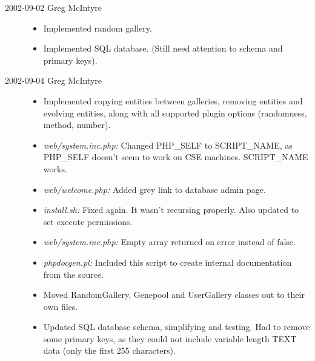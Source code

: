 \documentclass{article}
\begin{document}
\begin{description}
\begin{itemize}
\end{itemize}

\item[2002-09-02 Greg McIntyre]\hspace{0em}

\begin{itemize}

\item Implemented random gallery.
\item Implemented SQL database. (Still need attention to schema and primary keys). 

\end{itemize}

\item[2002-09-04 Greg McIntyre]\hspace{0em}

\begin{itemize}

\item Implemented copying entities between galleries, removing entities and evolving entities, along with all supported plugin options (randomness, method, number). 
\item \textit{web/system.inc.php:} Changed PHP\_SELF to SCRIPT\_NAME, as PHP\_SELF doesn't seem to work on CSE machines. SCRIPT\_NAME works.
\item \textit{web/welcome.php:} Added grey link to database admin page.
\item \textit{install.sh:} Fixed again. It wasn't recursing properly. Also updated to set execute permissions.
\item \textit{web/system.inc.php:} Empty array returned on error instead of false.
\item \textit{phpdocgen.pl:} Included this script to create internal documentation from the source.
\item Moved RandomGallery, Genepool and UserGallery classes out to their own files. 
\item Updated SQL database schema, simplifying and testing. Had to remove some primary keys, as they could not include variable length TEXT data (only the first 255 characters). 

\end{itemize}
\end{description}
\end{document}
